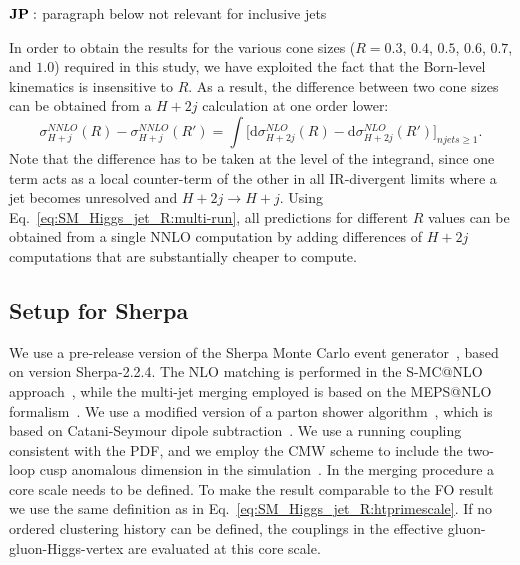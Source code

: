 \documentclass[aps,prd,onecolumn,fleqn,superscriptaddress,groupedaddress,nofootinbib,preprintnumbers,nobalancelastpage]{revtex4}
\begin{document}
$\bf JP:$ paragraph below not relevant for inclusive jets

In order to obtain the results for the various cone sizes ($R=0.3$, $0.4$,
$0.5$, $0.6$, $0.7$, and $1.0$) required in this study, we have exploited the
fact that the Born-level kinematics is insensitive to $R$.  As a result, the
difference between two cone sizes can be obtained from a $H+2j$ calculation at
one order lower:
\begin{equation}
  \sigma^{NNLO}_{H+j}(R) - \sigma^{NNLO}_{H+j}(R') =
  \int \bigl[
  \mathrm{d}\sigma^{NLO}_{H+2j}(R) - \mathrm{d}\sigma^{NLO}_{H+2j}(R')
  \bigr]_{njets\geq1} .
  \label{eq:SM_Higgs_jet_R:multi-run}
\end{equation}
Note that the difference has to be taken at the level of the integrand, since
one term acts as a local counter-term of the other in all IR-divergent limits
where a jet becomes unresolved and $H+2j \to H+j$.  Using
Eq.~\eqref{eq:SM_Higgs_jet_R:multi-run}, all predictions for different $R$ values can be
obtained from a single NNLO computation by adding differences of $H+2j$
computations that are substantially cheaper to compute.

\subsection{Setup for Sherpa}
We use a pre-release version of the 
Sherpa Monte Carlo event 
generator~\cite{Gleisberg:2003xi,Gleisberg:2008ta}, based on version Sherpa-2.2.4.  The
NLO matching is performed in the S-MC@NLO
approach~\cite{Hoeche:2011fd,Hoeche:2012ft}, while the multi-jet merging
employed is based on the MEPS@NLO
formalism~\cite{Gehrmann:2012yg,Hoeche:2012yf}. We use a modified version of a
parton shower algorithm~\cite{Schumann:2007mg}, which is based on Catani-Seymour
dipole subtraction~\cite{Catani:1996vz,Catani:2002hc}. We use a running coupling
consistent with the PDF, and we employ the CMW scheme to include the two-loop
cusp anomalous dimension in the simulation~\cite{Catani:1990rr}.  In the merging
procedure a core scale needs to be defined.  To make the result comparable to
the FO result we use the same definition as in Eq.~\eqref{eq:SM_Higgs_jet_R:htprimescale}. If no
ordered clustering history can be defined,  the couplings in the effective
gluon-gluon-Higgs-vertex are evaluated at this core scale. 
\end{document}
